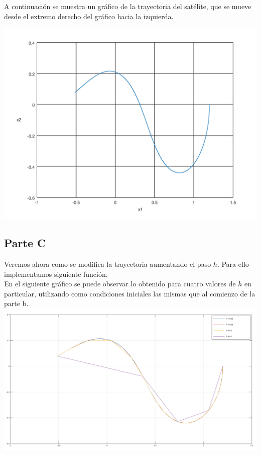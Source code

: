 \documentclass[titlepage,a4paper]{article}
\begin{document}
		A continuación se muestra un gráfico de la trayectoria del satélite, que se mueve desde el extremo
		derecho del gráfico hacia la izquierda.
		
		\includegraphics[width=\textwidth]{parteb.png}

	\subsection{Parte C}\label{sec:parteC}
	Veremos ahora como se modifica la trayectoria aumentando el paso $h$. Para ello implementamos siguiente función.\\

	

	En el siguiente gráfico se puede observar lo obtenido para cuatro valores  de $h$ en particular, utilizando como condiciones iniciales las mismas que al comienzo de la parte b.\\
	\includegraphics[width=\textwidth]{partec.png}
\end{document}
